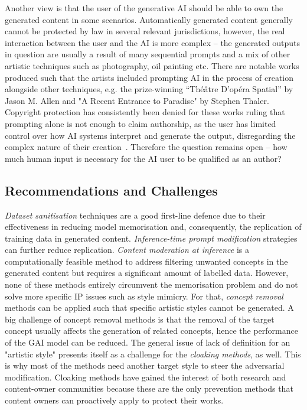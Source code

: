Another view is that the user of the generative AI should be able to own the generated content in some scenarios. Automatically generated content generally cannot be protected by law in several relevant jurisdictions, however, the real interaction between the user and the AI is more complex -- the generated outputs in question are usually a result of many sequential prompts and a mix of other artistic techniques such as photography, oil painting etc. 
There are notable works produced such that the artists included prompting AI in the process of creation alongside other techniques, e.g. the prize-winning “Théâtre D’opéra Spatial” by Jason M. Allen and "A Recent Entrance to Paradise" by Stephen Thaler.
Copyright protection has consistently been denied for these works ruling that prompting alone is not enough to claim authorship, as the user has limited control over how AI systems interpret and generate the output, disregarding the complex nature of their creation~\cite{roose_ai-generated_2022,brodkin_us_2023}.
Therefore the question remains open -- how much human input is necessary for the AI user to be qualified as an author?

\subsection{Recommendations and Challenges}\label{sec:conclusion:challenges}

\textit{Dataset sanitisation} techniques are a good first-line defence due to their effectiveness in reducing model memorisation and, consequently, the replication of training data in generated content. 
\textit{Inference-time prompt modification} strategies can further reduce replication. 
\textit{Content moderation at inference} is a computationally feasible method to address filtering unwanted concepts in the generated content but requires a significant amount of labelled data.
However, none of these methods entirely circumvent the memorisation problem and do not solve more specific IP issues such as style mimicry.
For that, \textit{concept removal} methods can be applied such that specific artistic styles cannot be generated.
A big challenge of concept removal methods is that the removal of the target concept usually affects the generation of related concepts, hence the performance of the GAI model can be reduced.
The general issue of lack of definition for an "artistic style" presents itself as a challenge for the \textit{cloaking methods}, as well. 
This is why most of the methods need another target style to steer the adversarial modification. 
Cloaking methods have gained the interest of both research and content-owner communities because these are the only prevention methods that content owners can proactively apply to protect their works. 

